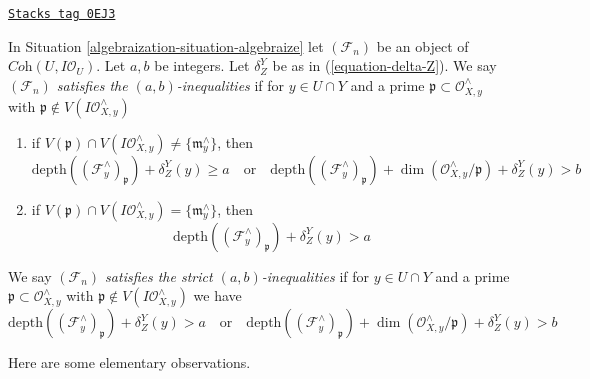 \begin{definition}[S d inequalities]
\label{algebraization-definition-s-d-inequalities}
\href{https://stacks.math.columbia.edu/tag/0EJ3}{\texttt{Stacks tag 0EJ3}}

In Situation \ref{algebraization-situation-algebraize} let $(\mathcal{F}_n)$ be an object
of $\textit{Coh}(U, I\mathcal{O}_U)$. Let $a, b$ be integers.
Let $\delta^Y_Z$ be as in (\ref{equation-delta-Z}).
We say
{\it $(\mathcal{F}_n)$ satisfies the $(a, b)$-inequalities} if for
$y \in U \cap Y$ and a prime $\mathfrak p \subset \mathcal{O}_{X, y}^\wedge$
with $\mathfrak p \not \in V(I\mathcal{O}_{X, y}^\wedge)$
\begin{enumerate}
\item if $V(\mathfrak p) \cap V(I\mathcal{O}_{X, y}^\wedge) \not =
\{\mathfrak m_y^\wedge\}$, then
$$
\text{depth}((\mathcal{F}^\wedge_y)_\mathfrak p) + \delta^Y_Z(y) \geq a
\quad\text{or}\quad
\text{depth}((\mathcal{F}^\wedge_y)_\mathfrak p) +
\dim(\mathcal{O}_{X, y}^\wedge/\mathfrak p) + \delta^Y_Z(y) > b
$$
\item if $V(\mathfrak p) \cap V(I\mathcal{O}_{X, y}^\wedge) =
\{\mathfrak m_y^\wedge\}$, then
$$
\text{depth}((\mathcal{F}^\wedge_y)_\mathfrak p) + \delta^Y_Z(y) > a
$$
\end{enumerate}
We say {\it $(\mathcal{F}_n)$ satisfies the strict $(a, b)$-inequalities}
if for $y \in U \cap Y$ and a prime
$\mathfrak p \subset \mathcal{O}_{X, y}^\wedge$ with
$\mathfrak p \not \in V(I\mathcal{O}_{X, y}^\wedge)$
we have
$$
\text{depth}((\mathcal{F}^\wedge_y)_\mathfrak p) + \delta^Y_Z(y) > a
\quad\text{or}\quad
\text{depth}((\mathcal{F}^\wedge_y)_\mathfrak p) +
\dim(\mathcal{O}_{X, y}^\wedge/\mathfrak p) + \delta^Y_Z(y) > b
$$
\end{definition}

Here are some elementary observations.

